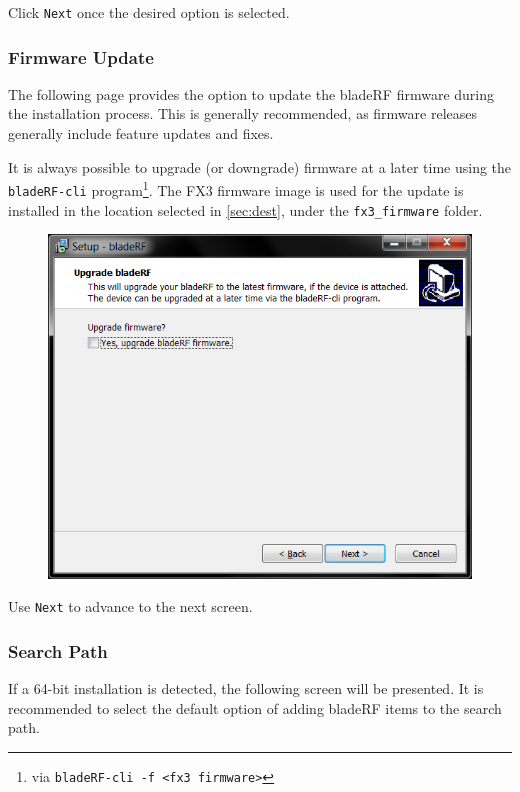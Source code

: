{Click \texttt{Next} once the desired option is selected.

\newpage
\subsubsection{Firmware Update} \label{sec:fwupdate}

The following page provides the option to update the bladeRF firmware during
the installation process. This is generally recommended, as firmware releases
generally include feature updates and fixes.

It is always possible to upgrade (or downgrade) firmware at a later time using
the \texttt{bladeRF-cli} program\footnote{via \texttt{bladeRF-cli -f <fx3
firmware>}}. The FX3 firmware image is used for the update is installed in the
location selected in \ref{sec:dest}, under the \texttt{fx3\_firmware} folder.

\begin{figure}[h]
  \centering
  \includegraphics{images/windows/installer/04-fwupgrade.png}
\end{figure}

Use \texttt{Next} to advance to the next screen.

\newpage
\subsubsection{\matlab Search Path} \label{sec:matlabsearchpath}

If a 64-bit \matlab installation is detected, the following screen will be
presented. It is recommended to select the default option of adding
bladeRF items to the \matlab search path.

}
